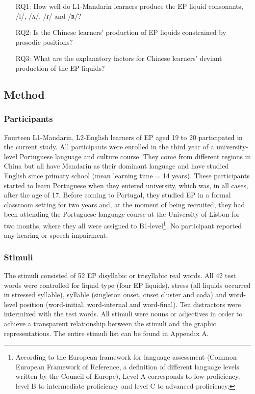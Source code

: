 \documentclass[output=paper]{../langscibook}
\begin{document}
\begin{itemize}
\item[RQ1:] How well do L1-Mandarin learners produce the EP liquid consonants, /l/, /ʎ/, /ɾ/ and /ʀ/?
\item[RQ2:] Is the Chinese learners’ production of EP liquids constrained by prosodic positions?
\item[RQ3:] What are the explanatory factors for Chinese learners’ deviant production of the EP liquids?
\end{itemize}

\subsection{Method}

\subsubsection{Participants}


Fourteen L1-Mandarin, L2-English learners of EP aged 19 to 20 participated in the current study. All participants were enrolled in the third year of a university-level Portuguese language and culture course. They come from different regions in China but all have Mandarin as their dominant language and have studied English since primary school (mean learning time = 14 years). These participants started to learn Portuguese when they entered university, which was, in all cases, after the age of 17. Before coming to Portugal, they studied EP in a formal classroom setting for two years and, at the moment of being recruited, they had been attending the Portuguese language course at the University of Lisbon for two months, where they all were assigned to B1-level\footnote{According to the European framework for language assessment (Common European Framework of Reference, a definition of different language levels written by the Council of Europe), Level A corresponds to low proficiency, level B to intermediate proficiency and level C to advanced proficiency.}. No participant reported any hearing or speech impairment.


\subsubsection{Stimuli}


The stimuli consisted of 52 EP disyllabic or trisyllabic real words. All 42 test words were controlled for liquid type (four EP liquids), stress (all liquids occurred in stress\-ed syllable), syllable (singleton onset, onset cluster and coda) and word-level position (word-initial, word-internal and word-final). Ten distractors were intermixed with the test words. All stimuli were nouns or adjectives in order to achieve a transparent relationship between the stimuli and the graphic representations. The entire stimuli list can be found in Appendix A.
\end{document}
